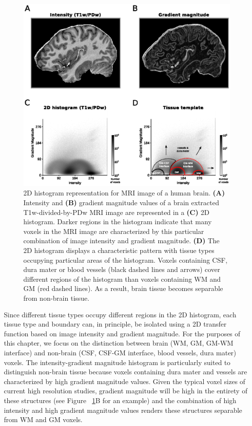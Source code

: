 \begin{figure}[htb!]
\centering
\includegraphics[width=\textwidth]{figures/chapter_02/figure_1.eps}
\caption{2D histogram representation for MRI image of a human brain.
\textbf{(A)} Intensity and \textbf{(B)} gradient magnitude values of a brain extracted T1w-divided-by-PDw MRI image are represented in a \textbf{(C)} 2D histogram. Darker regions in the histogram indicate that many voxels in the MRI image are characterized by this particular combination of image intensity and gradient magnitude. \textbf{(D)} The 2D histogram displays a characteristic pattern with tissue types occupying particular areas of the histogram. Voxels containing CSF, dura mater or blood vessels (black dashed lines and arrows) cover different regions of the histogram than voxels containing WM and GM (red dashed lines). As a result, brain tissue becomes separable from non-brain tissue.}
\label{fig:Fig1}
\end{figure}

Since different tissue types occupy different regions in the 2D histogram, each tissue type and boundary can, in principle, be isolated using a 2D transfer function based on image intensity and gradient magnitude. For the purposes of this chapter, we focus on the distinction between brain (WM, GM, GM-WM interface) and non-brain (CSF, CSF-GM interface, blood vessels, dura mater) voxels. The intensity-gradient magnitude histogram is particularly suited to distinguish non-brain tissue because voxels containing dura mater and vessels are characterized by high gradient magnitude values. Given the typical voxel sizes of current high resolution studies, gradient magnitude will be high in the entirety of these structures (see Figure ~\ref{fig:Fig1}B for an example) and the combination of high intensity and high gradient magnitude values renders these structures separable from WM and GM voxels.

